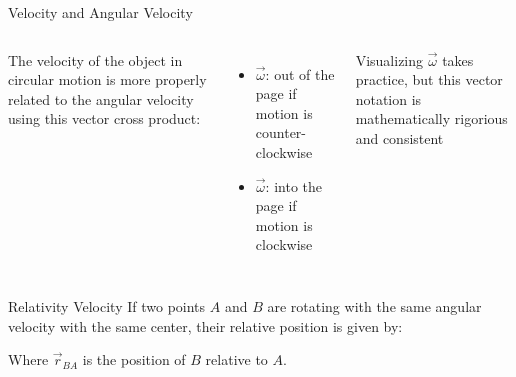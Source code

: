 \documentclass[12pt,compress,aspectratio=169]{beamer}
\begin{document}
\begin{frame}{Velocity and Angular Velocity}
  \begin{columns}

    The velocity of the object in circular motion is more properly related to
    the angular velocity using this vector cross product:


    \begin{itemize}
    \item\vspace{-.2in}$\vec\omega$: out of the page if motion is
      counter-clockwise
    \item $\vec\omega$: into the page if motion is clockwise
    \end{itemize}
    Visualizing $\vec\omega$ takes practice, but this vector notation is
    mathematically rigorious and consistent
  \end{columns}
\end{frame}



\begin{frame}{Relativity Velocity}
  If two points $A$ and $B$ are rotating with the same angular velocity with the
  same center, their relative position is given by:


  Where $\vec r_{BA}$ is the position of $B$ relative to $A$.
  
\end{frame}
\end{document}
